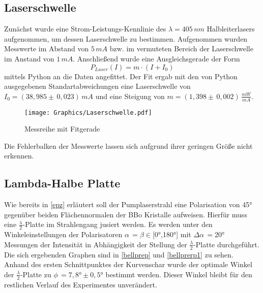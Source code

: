 \documentclass[twoside,colorback,accentcolor=tud4c,11pt]{tudreport}
\begin{document}
\subsection{Laserschwelle}
Zunächst wurde eine Strom-Leistungs-Kennlinie des $\lambda=405\,\si{nm}$ Halbleiterlasers aufgenommen, um dessen Laserschwelle zu bestimmen. Aufgenommen wurden Messwerte im Abstand von $5\,\si{mA}$ bzw. im vermuteten Bereich der Laserschwelle im Anstand von $1\,\si{mA}$. Anschließend wurde eine Ausgleichsgerade der Form
\begin{equation}
P_{Laser}(I)=m\cdot\left(I+I_{0}\right)
\end{equation}
mittels Python an die Daten angefittet. Der Fit ergab mit den von Python ausgegebenen Standartabweichungen eine Laserschwelle von $I_{0}=\left(38,985\pm\,0,023\right)\,\si{mA}$ und eine Steigung von $m=\left(1,398\pm\,0,002\right)\,\si{\frac{mW}{mA}}$.
\begin{figure}[H]
\centering
   	\begin{minipage}[b]{1.0\textwidth}
   	\texttt{[image: Graphics/Laserschwelle.pdf]}
   	\caption{Messreihe mit Fitgerade}
  	\label{laserschwelle}
   	\end{minipage}
\end{figure}
Die Fehlerbalken der Messwerte lassen sich aufgrund ihrer geringen Größe nicht erkennen.
\subsection{Lambda-Halbe Platte}
Wie bereits in \ref{epz} erläutert soll der Pumplaserstrahl eine Polarisation von 45° gegenüber beiden Flächennormalen der BBo Kristalle aufweisen. Hierfür muss eine $\frac{\lambda}{2}$-Platte im Strahlengang jusiert werden. Es werden unter den Winkeleinstellungen der Polarisatoren $\alpha\,=\beta\in$[0°,180°] mit $\Delta\alpha\,=20°$ Messungen der Intensität in Abhängigkeit der Stellung der $\frac{\lambda}{2}$-Platte durchgeführt. Die sich ergebenden Graphen sind in \ref{bellprep} und \ref{bellprerp1} zu sehen. Anhand des ersten Schnittpunktes der Kurvenschar wurde der optimale Winkel der $\frac{\lambda}{2}$-Platte zu $\phi\,=7,8°\pm0,5°$ bestimmt werden. Dieser Winkel bleibt für den restlichen Verlauf des Experimentes unverändert.
\begin{figure}[H]
  \centering
  \quad
  \quad
  \caption{ }
  \label{resisspule}
\end{figure}
\end{document}
